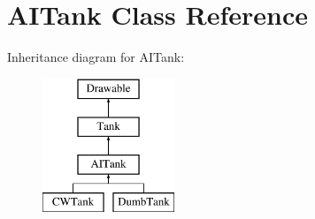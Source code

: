 \hypertarget{class_a_i_tank}{}\section{A\+I\+Tank Class Reference}
\label{class_a_i_tank}
Inheritance diagram for A\+I\+Tank\+:\begin{figure}[H]
\begin{center}
\leavevmode
\includegraphics[height=4.000000cm]{class_a_i_tank}
\end{center}
\end{figure}
